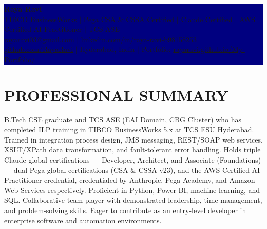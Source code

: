 \documentclass[10pt]{article}
\begin{document}
\pagestyle{empty}

\noindent\hspace*{-0.417in}%
\colorbox{navy}{%
  \begin{minipage}[t]{\paperwidth}
    \color{white}
    \vspace{3pt}
    \hspace{0.417in}%
    \begin{minipage}{\dimexpr\paperwidth-0.834in}
      {\fontsize{25}{27}\selectfont\bfseries Raya Ravi}\\[4pt]
      {\fontsize{10.5}{13}\selectfont TIBCO BusinessWorks $|$ Pega CSA \& CSSA Certified $|$ Claude Certified $|$ AWS Certified AI Practitioner $|$ TCS ASE}\\[3pt]
      {\fontsize{9.5}{12}\selectfont
        \href{mailto:rayaravi03@gmail.com}{\color{white}rayaravi03@gmail.com} $|$
        \href{https://www.linkedin.com/in/raya-ravi-b98158253/}{\color{white}linkedin.com/in/raya-ravi-b98158253} $|$
        \href{https://github.com/RayaRavi}{\color{white}github.com/RayaRavi} $|$
        Hyderabad, India $|$
        Portfolio: \href{https://rayaravi.github.io/My-Portfolio/}{\color{white}rayaravi.github.io/My-Portfolio/}
      }
    \end{minipage}
    \vspace{2pt}
  \end{minipage}%
}

\vspace{2pt}
\fontsize{9.0}{10.1}\selectfont

\section{PROFESSIONAL SUMMARY}
B.Tech CSE graduate and TCS ASE (EAI Domain, CBG Cluster) who has completed ILP training in TIBCO BusinessWorks 5.x at TCS ESU Hyderabad. Trained in integration process design, JMS messaging, REST/SOAP web services, XSLT/XPath data transformation, and fault-tolerant error handling. Holds triple Claude global certifications — Developer, Architect, and Associate (Foundations) — dual Pega global certifications (CSA \& CSSA v23), and the AWS Certified AI Practitioner credential, credentialed by Anthropic, Pega Academy, and Amazon Web Services respectively. Proficient in Python, Power BI, machine learning, and SQL. Collaborative team player with demonstrated leadership, time management, and problem-solving skills. Eager to contribute as an entry-level developer in enterprise software and automation environments.
\end{document}
